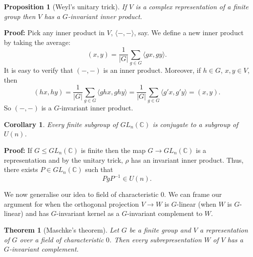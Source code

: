 \documentclass[12pt]{article}
\newtheorem{theorem}{Theorem}[section]
\newtheorem{corollary}{Corollary}[section]
\newtheorem{proposition}{Proposition}[section]
\theoremstyle{definition}
\theoremstyle{remark}
\begin{document}
\begin{proposition}[Weyl's unitary trick]
	If $V$ is a complex representation of a finite group then $V$ has a $G$-invariant inner product.
\end{proposition}

\begin{adjustbox}{minipage = \columnwidth - 25.5pt, margin=1em, frame=1pt, margin=0em}
	\textbf{Proof:} Pick any inner product in $V$, $\langle -, - \rangle$, say. We define a new inner product by taking the average:
	\[
		(x, y) = \frac{1}{|G|} \sum_{g \in G} \langle gx, gy \rangle
	.\]
	It is easy to verify that $(-, -)$ is an inner product. Moreover, if $h \in G$, $x, y \in V$, then
	\[
		(hx, hy) = \frac{1}{|G|} \sum_{g \in G} \langle ghx, ghy \rangle = \frac{1}{|G|} \sum_{g \in G} \langle g'x, g'y \rangle = (x, y)
	.\]
	So $(-, -)$ is a $G$-invariant inner product.
\end{adjustbox}

\begin{corollary}
	Every finite subgroup of $GL_n(\mathbb{C})$ is conjugate to a subgroup of $U(n)$.
\end{corollary}

\begin{adjustbox}{minipage = \columnwidth - 25.5pt, margin=1em, frame=1pt, margin=0em}
	\textbf{Proof:} If $G \leq GL_n(\mathbb{C})$ is finite then the map $G \to GL_n(\mathbb{C})$ is a representation and by the unitary trick, $\rho$ has an invariant inner product. Thus, there exists $P \in GL_n(\mathbb{C})$ such that
	\[
		P g P^{-1} \in U(n)
	.\]
\end{adjustbox}

We now generalise our idea to field of characteristic 0. We can frame our argument for when the orthogonal projection $V \to W$ is $G$-linear (when $W$ is $G$-linear) and has $G$-invariant kernel as a $G$-invariant complement to $W$.

\begin{theorem}[Maschke's theorem]
	Let $G$ be a finite group and $V$ a representation of $G$ over a field of characteristic $0$. Then every subrepresentation $W$ of $V$ has a $G$-invariant complement.
\end{theorem}
\end{document}
